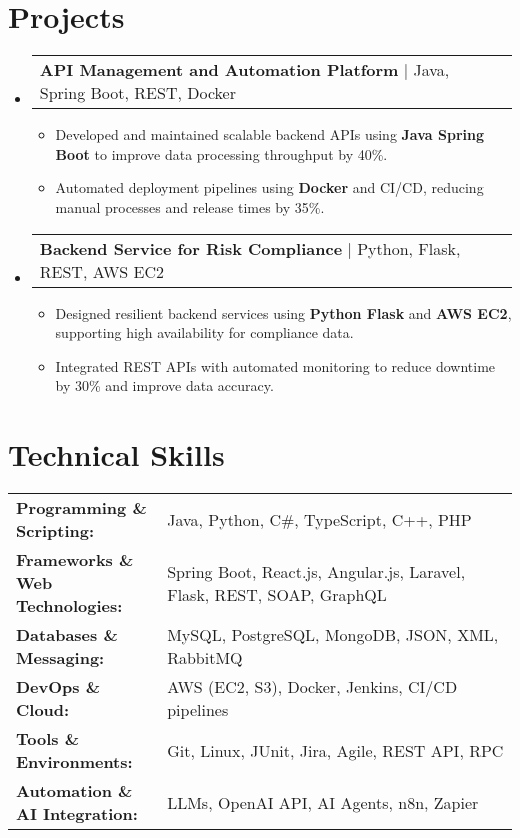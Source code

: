 \documentclass[letterpaper,11pt]{article}
\makeatletter
\newcommand{\resumeItem}[1]{
  \item\footnotesize{
    {#1 \vspace{-2pt}}
  }
}
\newcommand{\resumeProjectHeading}[2]{
    \item
    \begin{tabular*}{1.001\textwidth}{l@{\extracolsep{\fill}}r}
      \small#1 & \textbf{\small #2}\\
    \end{tabular*}\vspace{-7pt}
}
\newcommand{\resumeSubHeadingListStart}{\begin{itemize}[leftmargin=0pt, label={}]}
\newcommand{\resumeSubHeadingListEnd}{\end{itemize}}
\newcommand{\resumeItemListStart}{\begin{itemize}[leftmargin=*]}
\newcommand{\resumeItemListEnd}{\end{itemize}\vspace{-5pt}}
\makeatother
\begin{document}
\section{Projects}
    \vspace{-5pt}
    \resumeSubHeadingListStart
      \resumeProjectHeading
          {\textbf{API Management and Automation Platform} | Java, Spring Boot, REST, Docker}
          {}
          \resumeItemListStart
              \resumeItem{Developed and maintained scalable backend APIs using \textbf{Java Spring Boot} to improve data processing throughput by 40\%.}
              \resumeItem{Automated deployment pipelines using \textbf{Docker} and CI/CD, reducing manual processes and release times by 35\%.}
          \resumeItemListEnd
          \vspace{-16pt}
      \resumeProjectHeading
          {\textbf{Backend Service for Risk Compliance} | Python, Flask, REST, AWS EC2}
          {}
          \resumeItemListStart
              \resumeItem{Designed resilient backend services using \textbf{Python Flask} and \textbf{AWS EC2}, supporting high availability for compliance data.}
              \resumeItem{Integrated REST APIs with automated monitoring to reduce downtime by 30\% and improve data accuracy.}
          \resumeItemListEnd 
    \resumeSubHeadingListEnd
\vspace{-10pt}
\section{Technical Skills}
        \vspace{-14pt}
        \begin{table}[h]
            \footnotesize
            \begin{tabular}{p{0.3\linewidth} p{0.7\linewidth}}
                \textbf{Programming \& Scripting:} & Java, Python, C\#, TypeScript, C++, PHP \\
                \textbf{Frameworks \& Web Technologies:} & Spring Boot, React.js, Angular.js, Laravel, Flask, REST, SOAP, GraphQL \\
                \textbf{Databases \& Messaging:} & MySQL, PostgreSQL, MongoDB, JSON, XML, RabbitMQ \\
                \textbf{DevOps \& Cloud:} & AWS (EC2, S3), Docker, Jenkins, CI/CD pipelines \\
                \textbf{Tools \& Environments:} & Git, Linux, JUnit, Jira, Agile, REST API, RPC \\
                \textbf{Automation \& AI Integration:} & LLMs, OpenAI API, AI Agents, n8n, Zapier \\
            \end{tabular}
        \end{table}
\end{document}
